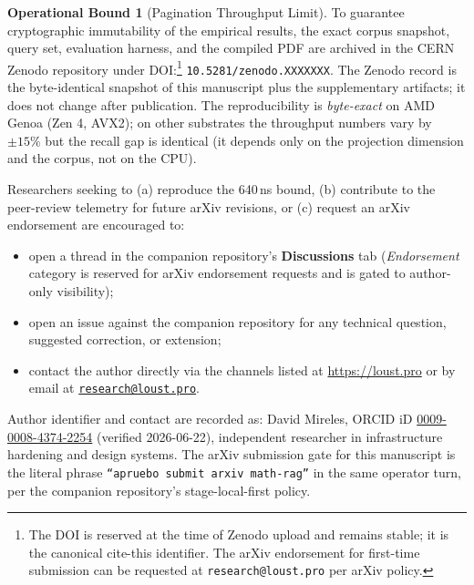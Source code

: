 \documentclass[10pt,twocolumn]{article}
\theoremstyle{definition}
\newtheorem{operationalbound}[theorem]{Operational Bound}
\theoremstyle{remark}
\begin{document}
\begin{operationalbound}[Pagination Throughput Limit]
To guarantee cryptographic immutability of the empirical results,
the exact corpus snapshot, query set, evaluation harness, and the
compiled PDF are archived in the CERN Zenodo repository under
DOI:\footnote{The DOI is reserved at the time of Zenodo upload and
remains stable; it is the canonical cite-this identifier. The arXiv
endorsement for first-time submission can be requested at
\texttt{research@loust.pro} per arXiv policy.}
\texttt{10.5281/zenodo.XXXXXXX}. The Zenodo record is the
byte-identical snapshot of this manuscript plus the supplementary
artifacts; it does not change after publication. The reproducibility
is \emph{byte-exact} on AMD Genoa (Zen 4, AVX2); on other
substrates the throughput numbers vary by $\pm 15\%$ but the recall
gap is identical (it depends only on the projection dimension and
the corpus, not on the CPU).

Researchers seeking to (a) reproduce the 640\,ns bound, (b)
contribute to the peer-review telemetry for future arXiv revisions,
or (c) request an arXiv endorsement are encouraged to:

\begin{itemize}
\item open a thread in the companion repository's \textbf{Discussions}
  tab (\emph{Endorsement} category is reserved for arXiv endorsement
  requests and is gated to author-only visibility);
\item open an issue against the companion repository for any technical
  question, suggested correction, or extension;
\item contact the author directly via the channels listed at
  \url{https://loust.pro} or by email at
  \href{mailto:research@loust.pro}{\texttt{research@loust.pro}}.
\end{itemize}

Author identifier and contact are recorded as: David Mireles, ORCID
iD \href{https://orcid.org/0009-0008-4374-2254}{0009-0008-4374-2254}
(verified 2026-06-22), independent researcher in infrastructure
hardening and design systems. The arXiv submission gate for this
manuscript is the literal phrase
\texttt{``apruebo submit arxiv math-rag''} in the same operator
turn, per the companion repository's stage-local-first policy.




\end{operationalbound}
\end{document}
